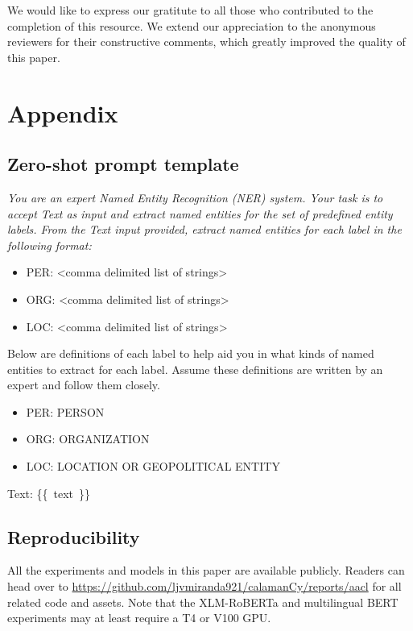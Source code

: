 \documentclass[11pt]{article}
\begin{document}
We would like to express our gratitute to all those who contributed to the completion of this resource.
We extend our appreciation to the anonymous reviewers for their constructive comments, which greatly improved the quality of this paper. 




\appendix

\section{Appendix}

\subsection{Zero-shot prompt template}
\label{appendix:prompt}

{
\itshape
You are an expert Named Entity Recognition 
(NER) system. Your task is to accept Text as 
input and extract named entities for the set 
of predefined entity labels. From the Text 
input provided, extract named entities for 
each label in the following format:

\begin{itemize}[noitemsep,topsep=0pt]
\item PER: <comma delimited list of strings>
\item ORG: <comma delimited list of strings>
\item LOC: <comma delimited list of strings>
\end{itemize}

Below are definitions of each label to help 
aid you in what kinds of named entities to 
extract for each label. Assume these 
definitions are written by an expert and 
follow them closely.

\begin{itemize}[noitemsep,topsep=0pt]
\item PER: PERSON
\item ORG: ORGANIZATION
\item LOC: LOCATION OR GEOPOLITICAL ENTITY
\end{itemize}

Text: \{\{~text~\}\}
}

\subsection{Reproducibility}

All the experiments and models in this paper are available publicly. 
Readers can head over to \url{https://github.com/ljvmiranda921/calamanCy/reports/aacl} for all related code and assets.
Note that the XLM-RoBERTa and multilingual BERT experiments may at least require a T4 or V100 GPU.
\end{document}
